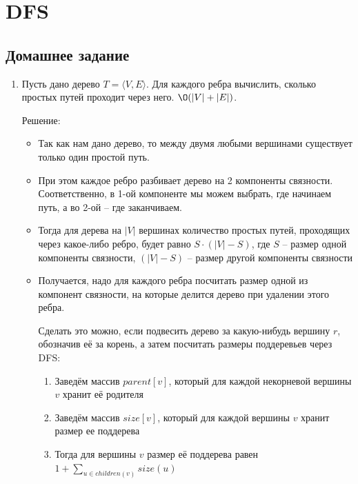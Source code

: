 \section{DFS}

\subsection{Домашнее задание}
\begin{enumerate}
  \item
    Пусть дано дерево $T = \langle V, E \rangle$. Для каждого ребра вычислить, сколько
    простых путей проходит через него. $\O(|V| + |E|)$.

    Решение:

    \begin{itemize}
      \item Так как нам дано дерево, то между двумя любыми вершинами существует только один простой путь.
      \item При этом каждое ребро разбивает дерево на 2 компоненты связности. Соответственно, в 1-ой компоненте мы можем выбрать, где начинаем путь, а во 2-ой -- где заканчиваем.

      \item Тогда для дерева на $|V|$ вершинах количество простых путей, проходящих через какое-либо ребро, будет равно $S \cdot (|V| - S)$, где
      \newline $S$ -- размер одной компоненты связности,
      \newline $(|V| - S)$ -- размер другой компоненты связности

      \item Получается, надо для каждого ребра посчитать размер одной из компонент связности, на которые делится дерево при удалении этого ребра.
      
      Сделать это можно, если подвесить дерево за какую-нибудь вершину $r$, обозначив её за корень, а затем посчитать размеры поддеревьев через DFS:
      \begin{enumerate}
        \item Заведём массив $parent[v]$, который для каждой некорневой вершины $v$ хранит её родителя
        \item Заведём массив $size[v]$, который для каждой вершины $v$ хранит размер ее поддерева
        \item Тогда для вершины $v$ размер её поддерева равен $1 + \sum_{u \in children(v)} size(u)$
      \end{enumerate}
      

\end{itemize}
\end{enumerate}
